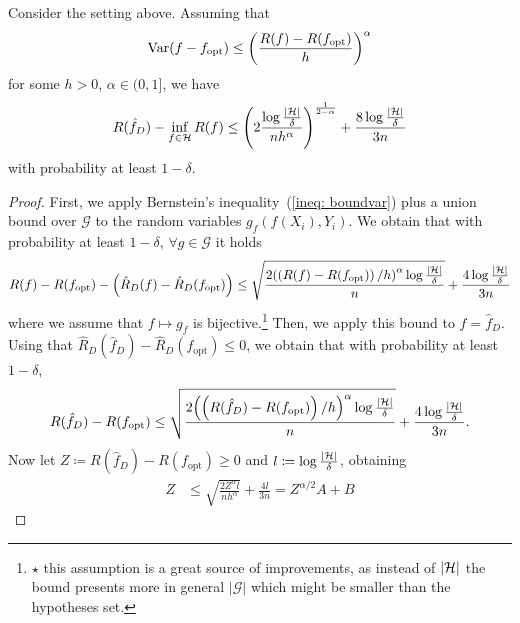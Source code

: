 \documentclass[reqno]{amsart}
\begin{document}
\begin{theorem}
    Consider the setting above. Assuming that 
    \begin{equation}
        \operatorname{Var}(f - f_\mathrm{opt}) \le {\left(\frac{R(f)-R(f_\mathrm{opt})}{h}\right)}^\alpha
    \end{equation}
    for some $h>0$, $\alpha \in (0,1]$, we have
    \begin{equation}
        R(\hat f_D) -\inf_{f \in \mathcal{H}} R(f) \le {\left(2\frac{\log \frac{\vert\mathcal H\vert}{\delta} }{nh^\alpha}\right)}^{\frac{1}{2-\alpha}} + \frac{8\log \frac{\vert\mathcal H\vert}{\delta}}{3n}
    \end{equation}
    with probability at least $1-\delta$.

    \begin{proof}
        First, we apply Bernstein's inequality~(\ref{ineq: boundvar}) plus a union bound over $\mathcal G$ to the random variables $g_f(f(X_i),Y_i)$. We obtain that with probability at least $1-\delta$, $\forall g\in \mathcal G$ it holds
        \begin{equation}
           R(f)-R(f_\mathrm{opt}) - \left(\hat R_D (f) - \hat R_D (f_\mathrm{opt})\right)
           \le
           \sqrt{\frac{2 {\left(\left(R(f)-R(f_\mathrm{opt})\right)/h\right)}^\alpha \log\frac{\vert \mathcal{H}\vert}{\delta}}{n}} + \frac{4 \log \frac{\vert\mathcal{H}\vert}{\delta}}{3n}
        \end{equation}
        where we assume that $f\mapsto g_f$ is bijective.\footnote{$\star$ this assumption is a great source of improvements, as instead of $\vert \mathcal{H}\vert$ the bound presents more in general $\vert \mathcal G\vert$ which might be smaller than the hypotheses set.}
        Then, we apply this bound to $f = \hat f_D$. Using that $\hat R_D (\hat f_D) - \hat R_D (f_\mathrm{opt}) \le 0$, we obtain that with probability at least $1-\delta$,
        \begin{equation}
            R(\hat f_D)-R(f_\mathrm{opt}) \le 
           \sqrt{\frac{2 {\left(\left(R(\hat f_D)-R(f_\mathrm{opt})\right)/h\right)}^\alpha \log\frac{\vert \mathcal{H}\vert}{\delta}}{n}} + \frac{4 \log \frac{\vert\mathcal{H}\vert}{\delta}}{3n}.
        \end{equation}
        Now let $Z \coloneq R(\hat f_D)-R(f_\mathrm{opt})\ge 0$ and $l \coloneq \log \frac{\vert\mathcal{H}\vert}{\delta}$, obtaining
        \begin{align}
            Z &\le \sqrt{\frac{2Z^\alpha l}{nh^\alpha}} + \frac{4l}{3n}
            = Z^{\alpha/2} A + B
        \end{align}

\end{proof}
\end{theorem}
\end{document}
